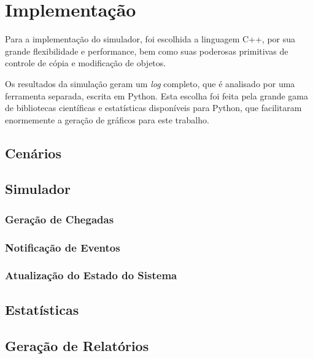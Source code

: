 \chapter{\label{chap:impl}Implementação}

Para a implementação do simulador, foi escolhida a linguagem C++, por sua grande
flexibilidade e performance, bem como suas poderosas primitivas de controle de
cópia e modificação de objetos.

Os resultados da simulação geram um \textit{log} completo, que é analisado por
uma ferramenta separada, escrita em Python. Esta escolha foi feita pela grande
gama de bibliotecas científicas e estatísticas disponíveis para Python, que
facilitaram enormemente a geração de gráficos para este trabalho.

\section{Cenários}

\lipsum[1]

\section{Simulador}

\lipsum[1]

\subsection{Geração de Chegadas}

\lipsum[1]

\subsection{Notificação de Eventos}

\lipsum[1]

\subsection{Atualização do Estado do Sistema}

\lipsum[1]

\section{Estatísticas}

\lipsum[1]

\section{Geração de Relatórios}


